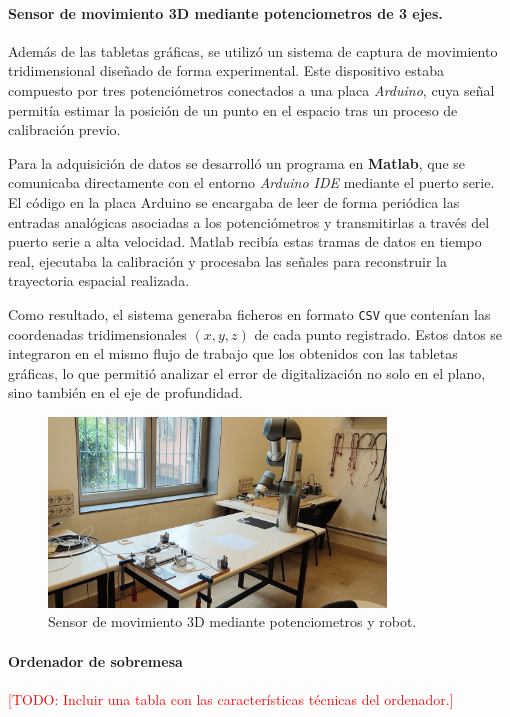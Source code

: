 \documentclass[12pt,a4paper,oneside]{report}
\newcommand{\todo}[1]{\textcolor{red}{[TODO: #1]}}
\begin{document}
\paragraph{Sensor de movimiento 3D mediante potenciometros de 3 ejes.}Además de las tabletas gráficas, se utilizó un sistema de captura de movimiento 
tridimensional diseñado de forma experimental. Este dispositivo estaba compuesto 
por tres potenciómetros conectados a una placa \textit{Arduino}, cuya señal 
permitía estimar la posición de un punto en el espacio tras un proceso de 
calibración previo.  

Para la adquisición de datos se desarrolló un programa en \textbf{Matlab}, que 
se comunicaba directamente con el entorno \textit{Arduino IDE} mediante el puerto 
serie. El código en la placa Arduino se encargaba de leer de forma periódica las 
entradas analógicas asociadas a los potenciómetros y transmitirlas a través del 
puerto serie a alta velocidad. Matlab recibía estas tramas de datos en tiempo real, 
ejecutaba la calibración y procesaba las señales para reconstruir la trayectoria 
espacial realizada.  

Como resultado, el sistema generaba ficheros en formato \texttt{CSV} que contenían 
las coordenadas tridimensionales $(x,y,z)$ de cada punto registrado. Estos datos 
se integraron en el mismo flujo de trabajo que los obtenidos con las tabletas 
gráficas, lo que permitió analizar el error de digitalización no solo en el plano, 
sino también en el eje de profundidad.

\begin{figure}[H]
\centering
\includegraphics[width=0.8\textwidth]{figuras/sistemapotrob.png.jpg}
\caption{Sensor de movimiento 3D mediante potenciometros y robot.}
\label{fig:Sensor3D}
\end{figure}

\paragraph{Ordenador de sobremesa}
\todo{Incluir una tabla con las características técnicas del ordenador.}
\end{document}
